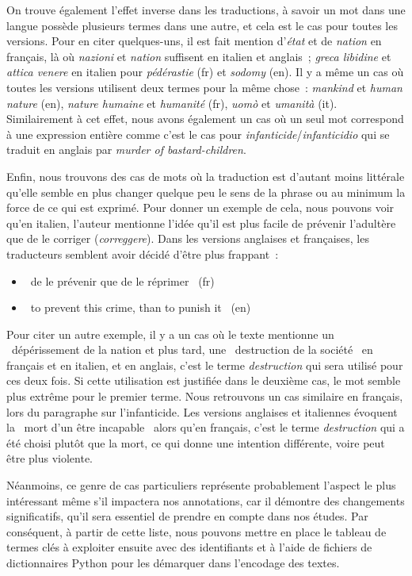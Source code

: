 On trouve également l'effet inverse dans les traductions, à savoir un mot dans une langue possède plusieurs termes dans une autre, et cela est le cas pour toutes les versions. Pour en citer quelques-uns, il est fait mention d'\textit{état} et de \textit{nation} en français, là où \textit{nazioni} et \textit{nation} suffisent en italien et anglais~; \textit{greca libidine} et \textit{attica venere} en italien pour \textit{pédérastie} (fr) et \textit{sodomy} (en). Il y a même un cas où toutes les versions utilisent deux termes pour la même chose~: \textit{mankind} et \textit{human nature} (en), \textit{nature humaine} et \textit{humanité} (fr), \textit{uomò} et \textit{umanità} (it). Similairement à cet effet, nous avons également un cas où un seul mot correspond à une expression entière comme c'est le cas pour \textit{infanticide}/\textit{infanticidio} qui se traduit en anglais par \textit{murder of bastard-children}.

Enfin, nous trouvons des cas de mots où la traduction est d'autant moins littérale qu'elle semble en plus changer quelque peu le sens de la phrase ou au minimum la force de ce qui est exprimé. Pour donner un exemple de cela, nous pouvons voir qu'en italien, l'auteur mentionne l'idée qu'il est plus facile de prévenir l'adultère que de le corriger (\textit{correggere}). Dans les versions anglaises et françaises, les traducteurs semblent avoir décidé d'être plus frappant~: 
\begin{itemize}
    \item \og~de le prévenir que de le réprimer~\fg{} (fr)
    \item \og~to prevent this crime, than to punish it~\fg{} (en)
\end{itemize}
Pour citer un autre exemple, il y a un cas où le texte mentionne un \og~dépérissement de la nation\fg{} et plus tard, une \og~destruction de la société~\fg{} en français et en italien, et en anglais, c'est le terme \textit{destruction} qui sera utilisé pour ces deux fois. Si cette utilisation est justifiée dans le deuxième cas, le mot semble plus extrême pour le premier terme. Nous retrouvons un cas similaire en français, lors du paragraphe sur l'infanticide. Les versions anglaises et italiennes évoquent la \og~mort d'un être incapable~\fg{} alors qu'en français, c'est le terme \textit{destruction} qui a été choisi plutôt que la mort, ce qui donne une intention différente, voire peut être plus violente. 

Néanmoins, ce genre de cas particuliers représente probablement l'aspect le plus intéressant même s'il impactera nos annotations, car il démontre des changements significatifs, qu'il sera essentiel de prendre en compte dans nos études. Par conséquent, à partir de cette liste, nous pouvons mettre en place le tableau de termes clés à exploiter ensuite avec des identifiants et à l'aide de fichiers de dictionnaires Python pour les démarquer dans l'encodage des textes.

